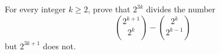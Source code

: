 For every integer $k \geq 2$, prove that $2^{3k}$ divides the number
\[
\binom{2^{k+1}}{2^k} - \binom{2^k}{2^{k-1}}
\]
but $2^{3k+1}$ does not.
